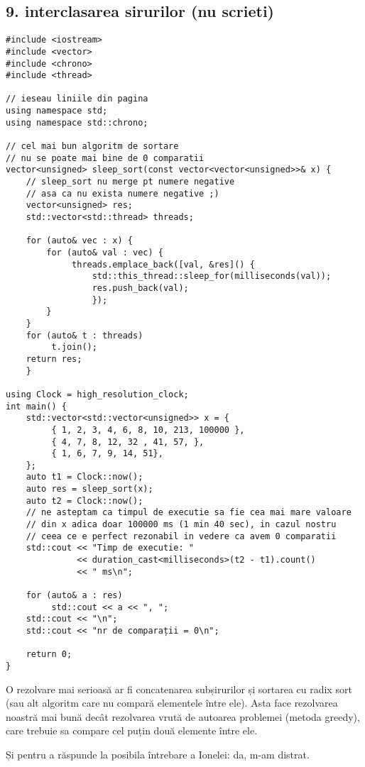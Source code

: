 \documentclass[11pt]{article}
\begin{document}
\subsection*{9. interclasarea sirurilor (nu scrieti)}
\label{sec:org8dbb666}
\begin{verbatim}
#include <iostream>
#include <vector>
#include <chrono>
#include <thread>

// ieseau liniile din pagina
using namespace std;
using namespace std::chrono;

// cel mai bun algoritm de sortare
// nu se poate mai bine de 0 comparatii
vector<unsigned> sleep_sort(const vector<vector<unsigned>>& x) {
    // sleep_sort nu merge pt numere negative
    // asa ca nu exista numere negative ;)
    vector<unsigned> res;
    std::vector<std::thread> threads;

    for (auto& vec : x) {
        for (auto& val : vec) {
             threads.emplace_back([val, &res]() {
                 std::this_thread::sleep_for(milliseconds(val));
                 res.push_back(val);
                 });
        }
    }
    for (auto& t : threads)
         t.join();
    return res;
    }

using Clock = high_resolution_clock;
int main() {
    std::vector<std::vector<unsigned>> x = {
         { 1, 2, 3, 4, 6, 8, 10, 213, 100000 },
         { 4, 7, 8, 12, 32 , 41, 57, }, 
         { 1, 6, 7, 9, 14, 51},
    };
    auto t1 = Clock::now();
    auto res = sleep_sort(x);
    auto t2 = Clock::now();
    // ne asteptam ca timpul de executie sa fie cea mai mare valoare 
    // din x adica doar 100000 ms (1 min 40 sec), in cazul nostru
    // ceea ce e perfect rezonabil in vedere ca avem 0 comparatii
    std::cout << "Timp de executie: " 
              << duration_cast<milliseconds>(t2 - t1).count()
              << " ms\n";

    for (auto& a : res)
         std::cout << a << ", ";
    std::cout << "\n";
    std::cout << "nr de comparații = 0\n";

    return 0;
}
\end{verbatim}

O rezolvare mai serioasă ar fi concatenarea subșirurilor și sortarea cu radix sort (sau alt algoritm care nu compară elementele între ele). Asta face rezolvarea noastră mai bună decât rezolvarea vrută de autoarea problemei (metoda greedy), care trebuie sa compare cel puțin două elemente între ele.

\vfill
Și pentru a răspunde la posibila întrebare a Ionelei: da, m-am distrat.
\end{document}
